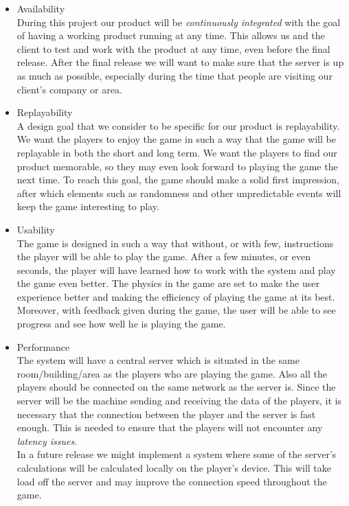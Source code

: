 \documentclass[11pt,twoside,a4paper]{article}
\begin{document}
\begin{itemize}
\item Availability \hfill \\
    During this project our product will be \emph{continuously integrated} with the goal of having a working product running at any time. This allows us and the client to test and work with the product at any time, even before the final release.
After the final release we will want to make sure that the server is up as much as possible, especially during the time that people are visiting our client's company or area. 
\item Replayability \hfill \\
    A design goal that we consider to be specific for our product is replayability. We want the players to enjoy the game in such a way that the game will be replayable in both the short and long term. We want the players to find our product memorable, so they may even look forward to playing the game the next time. To reach this goal, the game should make a solid first impression, after which elements such as randomness and other unpredictable events will keep the game interesting to play.
\item Usability \hfill \\
    The game is designed in such a way that without, or with few, instructions the player will be able to play the game. After a few minutes, or even seconds, the player will have learned how to work with the system and play the game even better. The physics in the game are set to make the user experience better and making the efficiency of playing the game at its best.\\ Moreover, with feedback given during the game, the user will be able to see progress and see how well he is playing the game.
\item Performance \hfill \\
    The system will have a central server which is situated in the same room/building/area as the players who are playing the game. Also all the players should be connected on the same network as the server is. Since the server will be the machine sending and receiving the data of the players, it is necessary that the connection between the player and the server is fast enough. This is needed to ensure that the players will not encounter any \emph{latency issues}. \\
    In a future release we might implement a system where some of the server's calculations will be calculated locally on the player's device. This will take load off the server and may improve the connection speed throughout the game.
\end{itemize}
\end{document}
